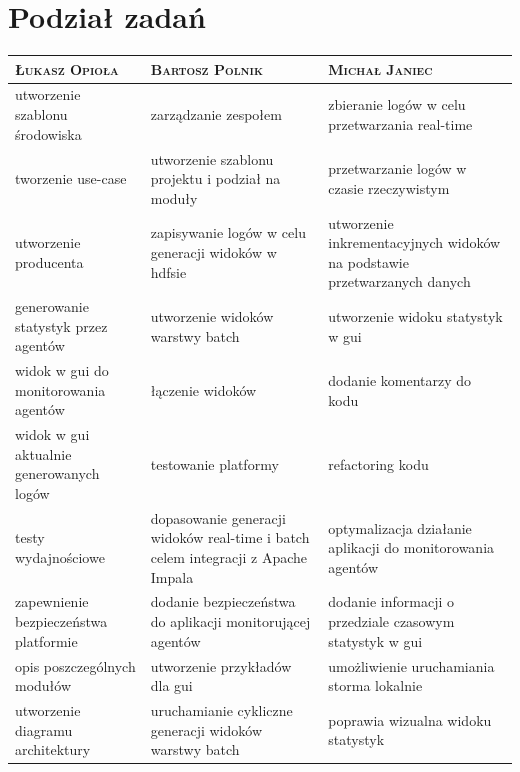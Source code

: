 \documentclass[a4paper,11pt]{article}
\begin{document}
\section{Podział zadań}

\begin{tabularx}{\linewidth}{ X | X | X}
  \textsc{Łukasz Opioła} & \textsc{Bartosz Polnik} & \textsc{Michał Janiec} \\ \hline
  utworzenie szablonu środowiska & zarządzanie zespołem & zbieranie logów w celu przetwarzania real-time \\ \hline
  tworzenie use-case & utworzenie szablonu projektu i podział na moduły & przetwarzanie logów w czasie rzeczywistym \\ \hline
  utworzenie producenta & zapisywanie logów w celu generacji widoków w hdfsie & utworzenie inkrementacyjnych widoków na podstawie przetwarzanych danych \\ \hline
  generowanie statystyk przez agentów & utworzenie widoków warstwy batch & utworzenie widoku statystyk w gui \\ \hline
  widok w gui do monitorowania agentów & łączenie widoków & dodanie komentarzy do kodu \\ \hline
  widok w gui aktualnie generowanych logów & testowanie platformy & refactoring kodu \\ \hline
  testy wydajnościowe & dopasowanie generacji widoków real-time i batch celem integracji z Apache Impala & optymalizacja działanie aplikacji do monitorowania agentów \\ \hline
  zapewnienie bezpieczeństwa platformie & dodanie bezpieczeństwa do aplikacji monitorującej agentów & dodanie informacji o przedziale czasowym statystyk w gui\\ \hline
  opis poszczególnych modułów & utworzenie przykładów dla gui & umożliwienie uruchamiania storma lokalnie \\ \hline
  utworzenie diagramu architektury & uruchamianie cykliczne generacji widoków warstwy batch & poprawia wizualna widoku statystyk\\ \hline
\end{tabularx}
\end{document}
